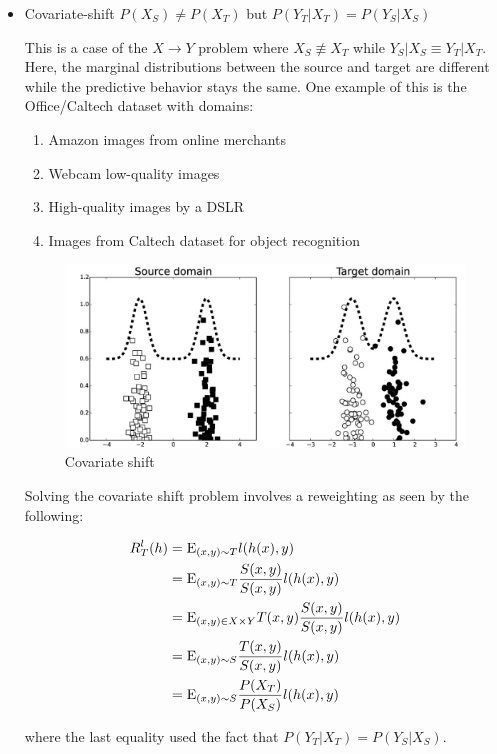 \begin{itemize}
	\item Covariate-shift
	$P(X_S)\neq P(X_T)$ but $P(Y_T|X_T)= P(Y_S|X_S)$
	
	This is a case of the $X\to Y$ problem where $X_S\not\equiv X_T$ while $Y_S|X_S \equiv Y_T|X_T$. Here, the marginal distributions between the source and target are different while the predictive behavior stays the same. One example of this is the Office/Caltech dataset with domains:
	
	\begin{enumerate}
		\item Amazon images from online merchants
		\item Webcam low-quality images
		\item High-quality images by a DSLR
		\item Images from Caltech dataset for object recognition
	\end{enumerate}
	
	\begin{figure}
		\centering
		\includegraphics[width=0.7\linewidth]{pictures/covariate_shift}
		\caption[Covariate shift illustration]{Covariate shift}
		\label{fig:covariateshift}
	\end{figure}

	Solving the covariate shift problem involves a reweighting as seen by the following:
	
	\begin{align*}
	R^l_T(h) &= \mathrm{E}_{(x,y)\sim T} l(h(x),y) \\
	&= \mathrm{E}_{(x,y)\sim T} \frac{S(x,y)}{S(x,y)}l(h(x),y) \\
	&= \mathrm{E}_{(x,y)\in X\times Y} T(x,y)\frac{S(x,y)}{S(x,y)}l(h(x),y) \\
	&= \mathrm{E}_{(x,y)\sim S} \frac{T(x,y)}{S(x,y)}l(h(x),y) \\
	&= \mathrm{E}_{(x,y)\sim S} \frac{P(X_T)}{P(X_S)}l(h(x),y)
	\end{align*}
	
	where the last equality used the fact that $P(Y_T|X_T)=P(Y_S|X_S)$.
	

\end{itemize}
